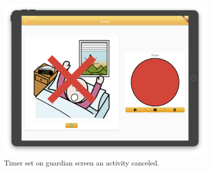 \begin{figure}[H]
    \begin{center}
        \includegraphics[width=0.95\textwidth]{figures/FinalScreen/showActivityGuardianCanled.png}
    \end{center}
    \caption{Timer set on guardian screen an activity canceled.}
    \label{fig:finalShowActivityGuardianWithTimer}
\end{figure}

